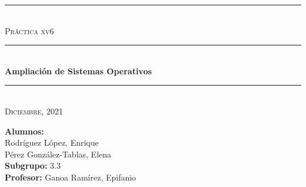 \begin{titlepage}
	\begin{center}
		\rule{15cm}{0pt} \\
		[3cm]
		\textsc{\Large Práctica xv6} \\
		\rule{15cm}{1pt} \\
		[0.25cm]
		\huge{\bfseries Ampliación de Sistemas Operativos} \\
		\rule{15cm}{1pt} \\
		[0.25cm]
		\textsc{\Large Diciembre, 2021}\\
		[9cm]
	\end{center}
	\begin{flushright}
		\textbf{Alumnos:} \\
		Rodríguez López, Enrique \\
		Pérez González-Tablas, Elena \\	
		[0.25cm]
		\textbf{Subgrupo:} 3.3 \\
		[0.25cm]
		\textbf{Profesor:} Ganoa Ramírez, Epifanio\\
	\end{flushright}
\end{titlepage}
\newpage
\begin{titlepage}
	\begin{flushleft}
	\end{flushleft}
\end{titlepage}
